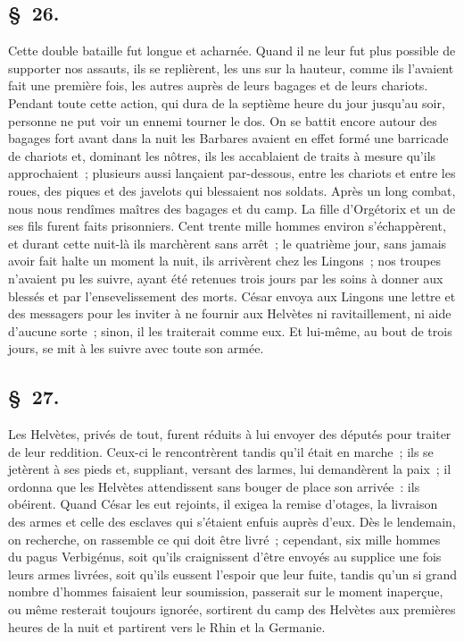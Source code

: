 \documentclass[french,twoside]{book} %
\begin{document}
\subsection[{§ 26.}]{ \textsc{§ 26.} }
\noindent Cette double bataille fut longue et acharnée. Quand il ne leur fut plus possible de supporter nos assauts, ils se replièrent, les uns sur la hauteur, comme ils l’avaient fait une première fois, les autres auprès de leurs bagages et de leurs chariots. Pendant toute cette action, qui dura de la septième heure du jour jusqu’au soir, personne ne put voir un ennemi tourner le dos. On se battit encore autour des bagages fort avant dans la nuit les Barbares avaient en effet formé une barricade de chariots et, dominant les nôtres, ils les accablaient de traits à mesure qu’ils approchaient ; plusieurs aussi lançaient par-dessous, entre les chariots et entre les roues, des piques et des javelots qui blessaient nos soldats. Après un long combat, nous nous rendîmes maîtres des bagages et du camp. La fille d’Orgétorix et un de ses fils furent faits prisonniers. Cent trente mille hommes environ s’échappèrent, et durant cette nuit-là ils marchèrent sans arrêt ; le quatrième jour, sans jamais avoir fait halte un moment la nuit, ils arrivèrent chez les Lingons ; nos troupes n’avaient pu les suivre, ayant été retenues trois jours par les soins à donner aux blessés et par l’ensevelissement des morts. César envoya aux Lingons une lettre et des messagers pour les inviter à ne fournir aux Helvètes ni ravitaillement, ni aide d’aucune sorte ; sinon, il les traiterait comme eux. Et lui-même, au bout de trois jours, se mit à les suivre avec toute son armée.
\subsection[{§ 27.}]{ \textsc{§ 27.} }
\noindent Les Helvètes, privés de tout, furent réduits à lui envoyer des députés pour traiter de leur reddition. Ceux-ci le rencontrèrent tandis qu’il était en marche ; ils se jetèrent à ses pieds et, suppliant, versant des larmes, lui demandèrent la paix ; il ordonna que les Helvètes attendissent sans bouger de place son arrivée : ils obéirent. Quand César les eut rejoints, il exigea la remise d’otages, la livraison des armes et celle des esclaves qui s’étaient enfuis auprès d’eux. Dès le lendemain, on recherche, on rassemble ce qui doit être livré ; cependant, six mille hommes du pagus Verbigénus, soit qu’ils craignissent d’être envoyés au supplice une fois leurs armes livrées, soit qu’ils eussent l’espoir que leur fuite, tandis qu’un si grand nombre d’hommes faisaient leur soumission, passerait sur le moment inaperçue, ou même resterait toujours ignorée, sortirent du camp des Helvètes aux premières heures de la nuit et partirent vers le Rhin et la Germanie.
\end{document}

